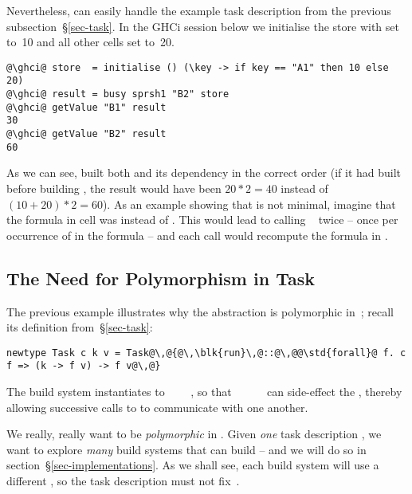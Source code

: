 Nevertheless,  can easily handle the example task description
 from the previous subsection~\S\ref{sec-task}. In the GHCi session
below we initialise the store with  set to~10 and all other cells set
to~20.

\begin{verbatim}
@\ghci@ store  = initialise () (\key -> if key == "A1" then 10 else 20)
@\ghci@ result = busy sprsh1 "B2" store
@\ghci@ getValue "B1" result
30
@\ghci@ getValue "B2" result
60
\end{verbatim}

\noindent
As we can see,  built both  and its dependency  in the
correct order (if it had built  before building , the result would
have been $20 * 2 = 40$ instead of $(10 + 20) * 2 = 60$). As an example showing
that  is not minimal, imagine that the formula in cell  was
 instead of . This would lead to calling
~ twice -- once per occurrence of  in the
formula -- and each call would recompute the formula in .

\subsection{The Need for Polymorphism in Task}\label{sec-why-polymorphism}

The previous example illustrates why the  abstraction is polymorphic
in~; recall its definition from~\S\ref{sec-task}:

\begin{verbatim}
newtype Task c k v = Task@\,@{@\,\blk{run}\,@::@\,@@\std{forall}@ f. c f => (k -> f v) -> f v@\,@}
\end{verbatim}

\noindent
The  build system instantiates  to
~~~~,
so that ~\hs{::}~~\hs{->}~~ can side-effect the
, thereby allowing successive calls to  to communicate with
one another.

We really, really want  to be \emph{polymorphic} in .
Given \emph{one} task description , we want to explore \emph{many} build
systems that can build  -- and we will do so in
section~\S\ref{sec-implementations}. As we shall see, each build system will use
a different , so the task description must not fix~.

